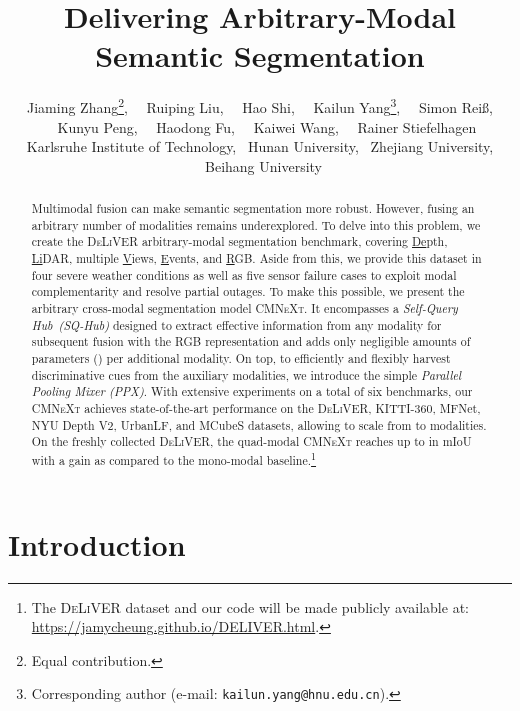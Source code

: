 \documentclass[10pt,twocolumn,letterpaper]{article}
\begin{document}
\title{Delivering Arbitrary-Modal Semantic Segmentation}

\author{Jiaming Zhang\thanks{Equal contribution.},
~~Ruiping Liu,
~~Hao Shi,
~~Kailun Yang\thanks{Corresponding author (e-mail: {\tt kailun.yang@hnu.edu.cn}).},
~~Simon Reiß,\\
~~Kunyu Peng,
~~Haodong Fu,
~~Kaiwei Wang,
~~Rainer Stiefelhagen\\
\normalsize
Karlsruhe Institute of Technology,
\normalsize
~Hunan University,
\normalsize
~Zhejiang University,
\normalsize
~Beihang University
}
\maketitle

\begin{abstract}
Multimodal fusion can make semantic segmentation more robust. However, fusing an arbitrary number of modalities remains underexplored. To delve into this problem, we create the \textsc{DeLiVER} arbitrary-modal segmentation benchmark, covering \underline{De}pth, \underline{Li}DAR, multiple \underline{V}iews, \underline{E}vents, and \underline{R}GB. Aside from this, we provide this dataset in four severe weather conditions as well as five sensor failure cases to exploit modal complementarity and resolve partial outages. To make this possible, we present the arbitrary cross-modal segmentation model \textsc{CMNeXt}. It encompasses a \emph{Self-Query Hub~(SQ-Hub)} designed to extract effective information from any modality for subsequent fusion with the RGB representation and adds only negligible amounts of parameters () per additional modality. On top, to efficiently and flexibly harvest discriminative cues from the auxiliary modalities, we introduce the simple \emph{Parallel Pooling Mixer (PPX)}. With extensive experiments on a total of six benchmarks, our \textsc{CMNeXt} achieves state-of-the-art performance on the \textsc{DeLiVER}, KITTI-360, MFNet, NYU Depth V2, UrbanLF, and MCubeS datasets, allowing to scale from  to  modalities. On the freshly collected \textsc{DeLiVER}, the quad-modal \textsc{CMNeXt} reaches up to  in mIoU with a  gain as compared to the mono-modal baseline.\footnote{The \textsc{DeLiVER} dataset and our code will be made publicly available at: \url{https://jamycheung.github.io/DELIVER.html}.} \end{abstract}

\section{Introduction}
\label{sec:intro}
\end{document}
